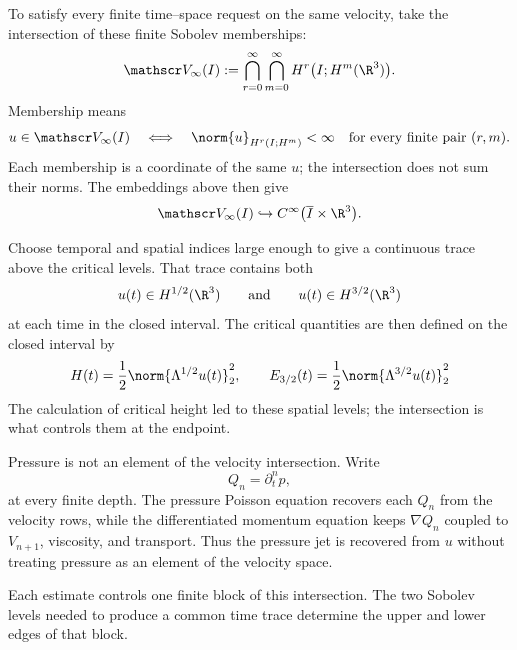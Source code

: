 To satisfy every finite time--space request on the same velocity, take the intersection of these finite Sobolev memberships:
\[
  \mathscr V_\infty(I)
  :=
  \bigcap_{r=0}^{\infty}
  \bigcap_{m=0}^{\infty}
  H^r\bigl(I;H^m(\R^3)\bigr).
\]
Membership means
\[
  u\in\mathscr V_\infty(I)
  \quad\Longleftrightarrow\quad
  \norm{u}_{H^r(I;H^m)}
  <
  \infty
  \quad
  \text{for every finite pair }(r,m).
\]
Each membership is a coordinate of the same \(u\); the intersection does not sum their norms.
The embeddings above then give
\[
  \mathscr V_\infty(I)
  \hookrightarrow
  C^\infty\bigl(\overline I\times\R^3\bigr).
\]

Choose temporal and spatial indices large enough to give a continuous trace above the critical levels.
That trace contains both
\[
  u(t)\in H^{1/2}(\R^3)
  \qquad\text{and}\qquad
  u(t)\in H^{3/2}(\R^3)
\]
at each time in the closed interval.
The critical quantities are then defined on the closed interval by
\[
  H(t)=\frac12\norm{\Lambda^{1/2}u(t)}_2^2,
  \qquad
  E_{3/2}(t)=\frac12\norm{\Lambda^{3/2}u(t)}_2^2
\]
The calculation of critical height led to these spatial levels; the intersection is what controls them at the endpoint.

Pressure is not an element of the velocity intersection.
Write
\[
  Q_n=\partial_t^np,
\]
at every finite depth.
The pressure Poisson equation recovers each \(Q_n\) from the velocity rows, while the differentiated momentum equation keeps \(\nabla Q_n\) coupled to \(V_{n+1}\), viscosity, and transport.
Thus the pressure jet is recovered from \(u\) without treating pressure as an element of the velocity space.

Each estimate controls one finite block of this intersection.
The two Sobolev levels needed to produce a common time trace determine the upper and lower edges of that block.
